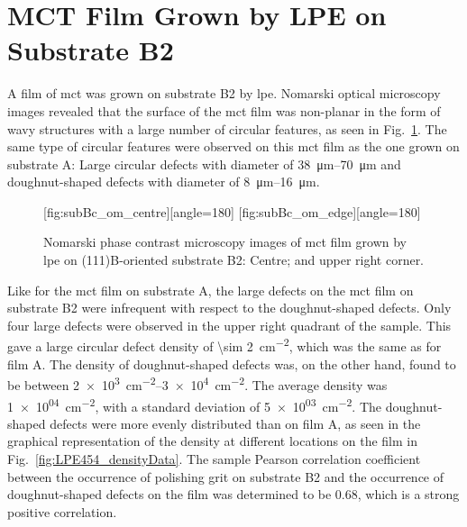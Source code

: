 \clearpage
\section{MCT Film Grown by LPE on Substrate B2}\label{sec:subBc}

A film of \ac{mct} was grown on substrate B2 by \ac{lpe}. Nomarski optical microscopy images revealed that the surface of the \ac{mct} film was non-planar in the form of wavy structures with a large number of circular features, as seen in Fig.~\ref{fig:subBc_om}. The same type of circular features were observed on this \ac{mct} film as the one grown on substrate A: Large circular defects with diameter of \SIrange{38}{70}{\micro\metre} and doughnut-shaped defects with diameter of \SIrange{8}{16}{\micro\metre}.

\begin{figure}[htbp]
    \centering
    [fig:subBc_om_centre][angle=180]
    \hfill
    [fig:subBc_om_edge][angle=180]
    \caption[Nomarski phase contrast microscopy images of \ac{mct} film grown by \ac{lpe} on substrate B2.]{Nomarski phase contrast microscopy images of \ac{mct} film grown by \ac{lpe} on (111)B-oriented substrate B2:  Centre; and  upper right corner.}
    \label{fig:subBc_om}
\end{figure}


Like for the \ac{mct} film on substrate A, the large defects on the \ac{mct} film on substrate B2 were infrequent with respect to the doughnut-shaped defects. Only four large defects were observed in the upper right quadrant of the sample. This gave a large circular defect density of \SI{\sim 2}{\centi\metre^{-2}}, which was the same as for film A. The density of doughnut-shaped defects was, on the other hand, found to be between \SIrange{2e+3}{3e+4}{\centi\metre^{-2}}. The average density was \SI{1e+04}{\centi\metre^{-2}}, with a standard deviation of \SI{5e+03}{\centi\metre^{-2}}. The doughnut-shaped defects were more evenly distributed than on film A, as seen in the graphical representation of the density at different locations on the film in Fig.~\ref{fig:LPE454_densityData}. The sample Pearson correlation coefficient between the occurrence of polishing grit on substrate B2 and the occurrence of doughnut-shaped defects on the film was determined to be \SI{+0.68}{}, which is a strong positive correlation. 

